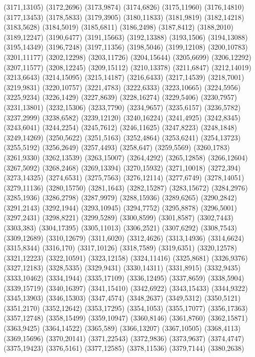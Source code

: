 (3171,13105)
(3172,2696)
(3173,9874)
(3174,6826)
(3175,11960)
(3176,14810)
(3177,13453)
(3178,5833)
(3179,3905)
(3180,11833)
(3181,9819)
(3182,14218)
(3183,5628)
(3184,5019)
(3185,6811)
(3186,2498)
(3187,8412)
(3188,2010)
(3189,12247)
(3190,6477)
(3191,15663)
(3192,13388)
(3193,1506)
(3194,13088)
(3195,14349)
(3196,7248)
(3197,11356)
(3198,5046)
(3199,12108)
(3200,10783)
(3201,11177)
(3202,12298)
(3203,11726)
(3204,15644)
(3205,6699)
(3206,12292)
(3207,11577)
(3208,12245)
(3209,15112)
(3210,13378)
(3211,6847)
(3212,14019)
(3213,6643)
(3214,15095)
(3215,14187)
(3216,6433)
(3217,14539)
(3218,7001)
(3219,9831)
(3220,10757)
(3221,4783)
(3222,6333)
(3223,10665)
(3224,5956)
(3225,9234)
(3226,1429)
(3227,8639)
(3228,16274)
(3229,5406)
(3230,7957)
(3231,13801)
(3232,15306)
(3233,7790)
(3234,9657)
(3235,6157)
(3236,5782)
(3237,2999)
(3238,6582)
(3239,12120)
(3240,16224)
(3241,4925)
(3242,8345)
(3243,6041)
(3244,2254)
(3245,7612)
(3246,11625)
(3247,8223)
(3248,1848)
(3249,14269)
(3250,5622)
(3251,5163)
(3252,4864)
(3253,6241)
(3254,13723)
(3255,5192)
(3256,2649)
(3257,4493)
(3258,647)
(3259,5569)
(3260,1783)
(3261,9330)
(3262,13539)
(3263,15007)
(3264,4292)
(3265,12858)
(3266,12604)
(3267,5092)
(3268,2468)
(3269,13394)
(3270,15932)
(3271,10018)
(3272,394)
(3273,14325)
(3274,6531)
(3275,7563)
(3276,12114)
(3277,6749)
(3278,14051)
(3279,11136)
(3280,15750)
(3281,1643)
(3282,15287)
(3283,15672)
(3284,2976)
(3285,1936)
(3286,2798)
(3287,9979)
(3288,15936)
(3289,6265)
(3290,2842)
(3291,2143)
(3292,1944)
(3293,10945)
(3294,7752)
(3295,8878)
(3296,5001)
(3297,2431)
(3298,8221)
(3299,5289)
(3300,8599)
(3301,8587)
(3302,7443)
(3303,383)
(3304,17395)
(3305,11013)
(3306,2521)
(3307,6292)
(3308,7543)
(3309,12689)
(3310,12679)
(3311,6020)
(3312,4626)
(3313,14936)
(3314,6624)
(3315,8344)
(3316,170)
(3317,10126)
(3318,7589)
(3319,6351)
(3320,12578)
(3321,12223)
(3322,10591)
(3323,12158)
(3324,11416)
(3325,8681)
(3326,9376)
(3327,12183)
(3328,5335)
(3329,9431)
(3330,14311)
(3331,8915)
(3332,9435)
(3333,10462)
(3334,1944)
(3335,17109)
(3336,12495)
(3337,8659)
(3338,5904)
(3339,15719)
(3340,16397)
(3341,15410)
(3342,6922)
(3343,15433)
(3344,9322)
(3345,13903)
(3346,15303)
(3347,4574)
(3348,2637)
(3349,5312)
(3350,5121)
(3351,2170)
(3352,12642)
(3353,17295)
(3354,1053)
(3355,17077)
(3356,17363)
(3357,12748)
(3358,15499)
(3359,10947)
(3360,8146)
(3361,8760)
(3362,15871)
(3363,9425)
(3364,14522)
(3365,589)
(3366,13207)
(3367,10505)
(3368,4113)
(3369,15696)
(3370,20141)
(3371,22543)
(3372,9836)
(3373,9637)
(3374,4747)
(3375,19423)
(3376,5161)
(3377,12585)
(3378,11536)
(3379,7144)
(3380,2638)
